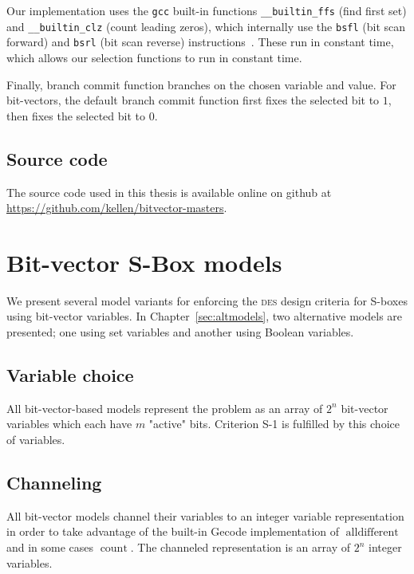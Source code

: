 \documentclass[a4paper,10pt,twoside,openright]{book}
\renewcommand{\sc}[1]{\textsc{\lowercase{#1}}}
\newcommand*\cd[1]{\texttt{#1}}
\DeclareMathOperator{\alldifferent}{alldifferent}
\DeclareMathOperator{\funccount}{count}
\begin{document}
Our implementation uses the 
\cd{gcc} built-in functions
\cd{__builtin_ffs} (find first set) and \cd{__builtin_clz} (count leading zeros),
which internally use the \cd{bsfl} (bit scan forward) and \cd{bsrl} (bit scan reverse)
instructions~\cite{intelffs}.
These run in constant time, which allows our 
selection functions to run in constant time.

Finally, branch commit function 
branches on the chosen variable and value. 
For bit-vectors, 
the default branch commit function first fixes the selected bit to $1$, then fixes the selected bit to $0$.

\section{Source code}

The source code used in this thesis is available online on github at \newline\url{https://github.com/kellen/bitvector-masters}.

\chapter{Bit-vector S-Box models}
\label{sec:bitvecmodels}

We present several model variants for enforcing the \sc{DES} design criteria for S-boxes using bit-vector variables.
In Chapter~\ref{sec:altmodels}, two alternative models are presented; one using set variables and another using Boolean variables.

\section{Variable choice}
All bit-vector-based models represent the problem as an array of $2^n$ bit-vector variables which each have $m$ "active" bits. 
Criterion S-1 is fulfilled by this choice of variables.

\section{Channeling}
All bit-vector models channel their variables to an integer variable representation in order to take advantage
of the built-in Gecode implementation of $\alldifferent$ and in some cases $\funccount$.
The channeled representation is an array of $2^n$ integer variables.
\end{document}
